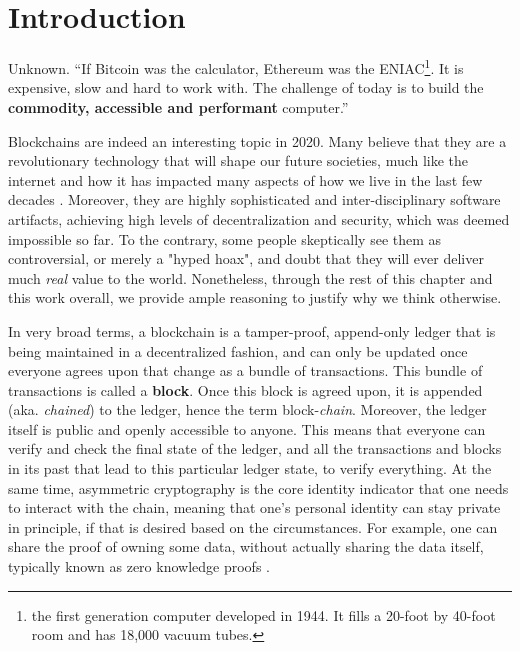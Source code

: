 \chapter{Introduction} \label{chap:intoroduction}

\ifpdf
    \graphicspath{{1_introduction/figures/PNG/}{1_introduction/figures/PDF/}{1_introduction/figures/}}
\else
    \graphicspath{{1_introduction/figures/EPS/}{1_introduction/figures/}}
\fi

\begin{chapquote}{Unknown.}
``If Bitcoin was the calculator, Ethereum was the ENIAC\footnote{the first generation computer
developed in 1944. It fills a 20-foot by 40-foot room and has 18,000 vacuum tubes.}. It is
expensive, slow and hard to work with. The challenge of today is to build the \textbf{commodity,
accessible and performant} computer.''
\end{chapquote}


Blockchains are indeed an interesting topic in 2020. Many believe that they are a revolutionary
technology that will shape our future societies, much like the internet and how it has impacted many
aspects of how we live in the last few decades \cite{will_blockchain_be_big_deal}. Moreover, they are
highly sophisticated and inter-disciplinary software artifacts, achieving high levels of
decentralization and security, which was deemed impossible so far. To the contrary, some people
skeptically see them as controversial, or merely a "hyped hoax", and doubt that they will ever
deliver much \textit{real} value to the world. Nonetheless, through the rest of this chapter and this work
overall, we provide ample reasoning to justify why we think otherwise.

In very broad terms, a blockchain is a tamper-proof, append-only ledger that is being maintained in
a decentralized fashion, and can only be updated once everyone agrees upon that change as a bundle
of transactions. This bundle of transactions is called a \textbf{block}. Once this block is agreed
upon, it is appended (aka. \textit{chained}) to the ledger, hence the term block-\textit{chain}.
Moreover, the ledger itself is public and openly accessible to anyone. This means that everyone can
verify and check the final state of the ledger, and all the transactions and blocks in its past that
lead to this particular ledger state, to verify everything. At the same time, asymmetric cryptography
is the core identity indicator that one needs to interact with the chain, meaning that one's
personal identity can stay private in principle, if that is desired based on the circumstances. For
example, one can share the proof of owning some data, without actually sharing the data itself,
typically known as zero knowledge proofs \cite{Goldreich_Oren_1994_ZK}.

